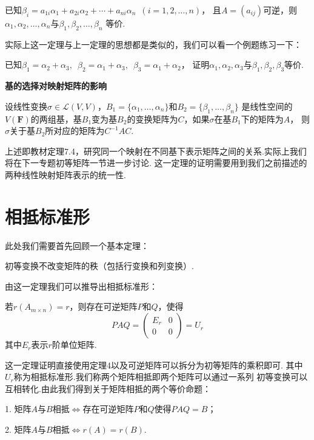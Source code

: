 \begin{theorem}
    已知$\beta_i=a_{1i}\alpha_1+a_{2i}\alpha_2+\cdots+a_{ni}\alpha_n\enspace(i=1,2,\ldots,n)$，
    且$A=(a_{ij})$可逆，则$\alpha_1,\alpha_2,\ldots,\alpha_n$与$\beta_1,\beta_2,\ldots,\beta_n$
    等价.
\end{theorem}
实际上这一定理与上一定理的思想都是类似的，我们可以看一个例题练习一下：
\begin{example}
    已知$\beta_1=\alpha_2+\alpha_3,\enspace\beta_2=\alpha_1+\alpha_3,\enspace\beta_3=\alpha_1+\alpha_2$，
    证明$\alpha_1,\alpha_2,\alpha_3$与$\beta_1,\beta_2,\beta_3$等价.
\end{example}
\begin{theorem}
    \textbf{\heiti 基的选择对映射矩阵的影响}

    设线性变换$\sigma \in \mathcal{L}(V,V)$，$B_1=\{\alpha_1,\ldots,\alpha_n\}$和$B_2=\{\beta_1,\ldots,\beta_n\}$
    是线性空间的$V(\mathbf{F})$的两组基，基$B_1$变为基$B_2$的变换矩阵为$C$，如果$\sigma$在基$B_1$下的矩阵为$A$，
    则$\sigma$关于基$B_2$所对应的矩阵为$C^{-1}AC$.
\end{theorem}
上述即教材定理7.4，研究同一个映射在不同基下表示矩阵之间的关系.实际上我们将在下一专题初等矩阵一节进一步讨论.
这一定理的证明需要用到我们之前描述的两种线性映射矩阵表示的统一性.

\section{相抵标准形}
此处我们需要首先回顾一个基本定理：
\begin{theorem}
    初等变换不改变矩阵的秩（包括行变换和列变换）.
\end{theorem}
由这一定理我们可以推导出相抵标准形：
\begin{theorem}
    若$r(A_{m \times n})=r$，则存在可逆矩阵$P$和$Q$，使得
    \[PAQ=\begin{pmatrix}
        E_r & 0 \\ 0 & 0
    \end{pmatrix}=U_r\]
    其中$E_r$表示$r$阶单位矩阵.
\end{theorem}
这一定理证明直接使用定理4以及可逆矩阵可以拆分为初等矩阵的乘积即可.
其中$U_r$称为相抵标准形.我们称两个矩阵相抵即两个矩阵可以通过一系列
初等变换可以互相转化.由此我们得到关于矩阵相抵的两个等价命题：

1. 矩阵$A$与$B$相抵$\iff$存在可逆矩阵$P$和$Q$使得$PAQ=B$；

2. 矩阵$A$与$B$相抵$\iff r(A)=r(B)$.

